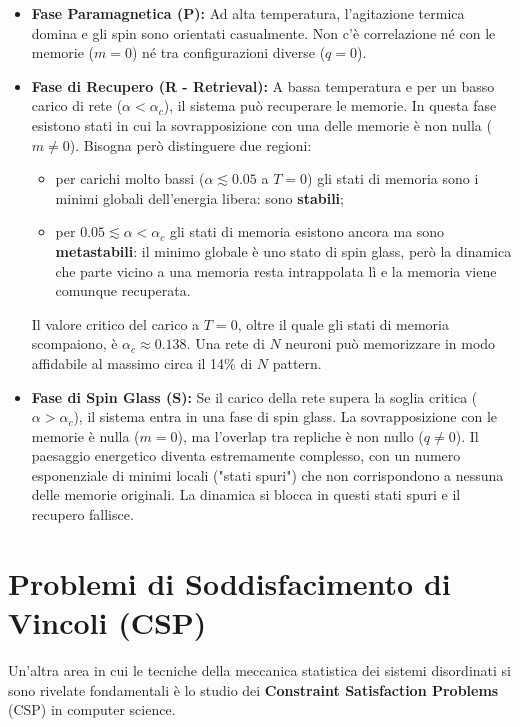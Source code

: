 \begin{itemize}
\item \textbf{Fase Paramagnetica (P):} Ad alta temperatura, l'agitazione termica domina e gli spin sono orientati casualmente. Non c'è correlazione né con le memorie ($m=0$) né tra configurazioni diverse ($q=0$).

\item \textbf{Fase di Recupero (R - Retrieval):} A bassa temperatura e per un basso carico di rete ($\alpha < \alpha_c$), il sistema può recuperare le memorie. In questa fase esistono stati in cui la sovrapposizione con una delle memorie è non nulla ($m \neq 0$). Bisogna però distinguere due regioni:
\begin{itemize}
    \item per carichi molto bassi ($\alpha \lesssim 0.05$ a $T=0$) gli stati di memoria sono i minimi globali dell'energia libera: sono \textbf{stabili};
    \item per $0.05 \lesssim \alpha < \alpha_c$ gli stati di memoria esistono ancora ma sono \textbf{metastabili}: il minimo globale è uno stato di spin glass, però la dinamica che parte vicino a una memoria resta intrappolata lì e la memoria viene comunque recuperata.
\end{itemize}
Il valore critico del carico a $T=0$, oltre il quale gli stati di memoria scompaiono, è $\alpha_c \approx 0.138$. Una rete di $N$ neuroni può memorizzare in modo affidabile al massimo circa il 14\% di $N$ pattern.

\item \textbf{Fase di Spin Glass (S):} Se il carico della rete supera la soglia critica ($\alpha > \alpha_c$), il sistema entra in una fase di spin glass. La sovrapposizione con le memorie è nulla ($m=0$), ma l'overlap tra repliche è non nullo ($q \neq 0$). Il paesaggio energetico diventa estremamente complesso, con un numero esponenziale di minimi locali ("stati spuri") che non corrispondono a nessuna delle memorie originali. La dinamica si blocca in questi stati spuri e il recupero fallisce.
\end{itemize}

\section{Problemi di Soddisfacimento di Vincoli (CSP)}

Un'altra area in cui le tecniche della meccanica statistica dei sistemi disordinati si sono rivelate fondamentali è lo studio dei \textbf{Constraint Satisfaction Problems} (CSP) in computer science. 

